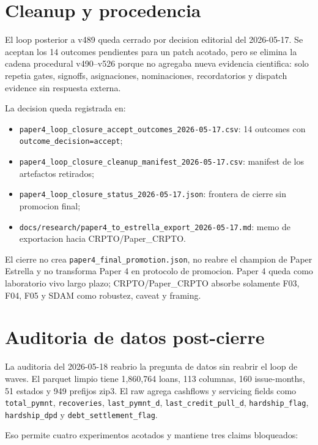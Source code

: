 \documentclass[
  spanish,
  11pt,
  letterpaper,
]{scrbook}
\providecommand{\tightlist}{%
  \setlength{\itemsep}{0pt}\setlength{\parskip}{0pt}}
\theoremstyle{plain}
\theoremstyle{remark}
\begin{document}
\section{Cleanup y procedencia}\label{cleanup-y-procedencia}

El loop posterior a v489 queda cerrado por decision editorial del
2026-05-17. Se aceptan los 14 outcomes pendientes para un patch acotado,
pero se elimina la cadena procedural v490--v526 porque no agregaba nueva
evidencia cientifica: solo repetia gates, signoffs, asignaciones,
nominaciones, recordatorios y dispatch evidence sin respuesta externa.

La decision queda registrada en:

\begin{itemize}
\tightlist
\item
  \texttt{paper4\_loop\_closure\_accept\_outcomes\_2026-05-17.csv}: 14
  outcomes con \texttt{outcome\_decision=accept};
\item
  \texttt{paper4\_loop\_closure\_cleanup\_manifest\_2026-05-17.csv}:
  manifest de los artefactos retirados;
\item
  \texttt{paper4\_loop\_closure\_status\_2026-05-17.json}: frontera de
  cierre sin promocion final;
\item
  \texttt{docs/research/paper4\_to\_estrella\_export\_2026-05-17.md}:
  memo de exportacion hacia CRPTO/Paper\_CRPTO.
\end{itemize}

El cierre no crea \texttt{paper4\_final\_promotion.json}, no reabre el
champion de Paper Estrella y no transforma Paper 4 en protocolo de
promocion. Paper 4 queda como laboratorio vivo largo plazo;
CRPTO/Paper\_CRPTO absorbe solamente F03, F04, F05 y SDAM como robustez,
caveat y framing.

\section{Auditoria de datos
post-cierre}\label{auditoria-de-datos-post-cierre}

La auditoria del 2026-05-18 reabrio la pregunta de datos sin reabrir el
loop de waves. El parquet limpio tiene 1,860,764 loans, 113 columnas,
160 issue-months, 51 estados y 949 prefijos zip3. El raw agrega
cashflows y servicing fields como \texttt{total\_pymnt},
\texttt{recoveries}, \texttt{last\_pymnt\_d},
\texttt{last\_credit\_pull\_d}, \texttt{hardship\_flag},
\texttt{hardship\_dpd} y \texttt{debt\_settlement\_flag}.

Eso permite cuatro experimentos acotados y mantiene tres claims
bloqueados:
\end{document}
